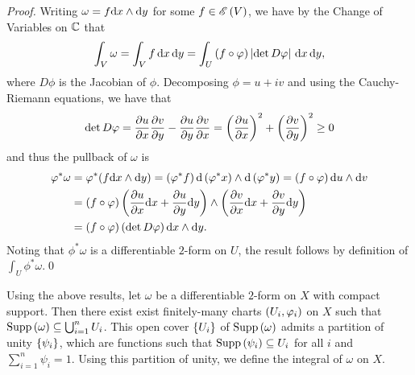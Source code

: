 \documentclass[../Moduli_Spaces_of_Riemann_Surfaces.tex]{subfiles}
\begin{document}
    \begin{proof}
        Writing $\omega=f\mathrm{d} x\wedge\mathrm{d} y$ for some $f\in\mathscr{E}\left(V\right)$, we have by the Change of Variables on $\mathbb{C}$ that
        \begin{equation*}
            \int_V\omega=\int_Vf\,\mathrm{d} x\,\mathrm{d} y=\int_U\left(f\circ\varphi\right)\left|\det D\varphi\right|\,\mathrm{d} x\,\mathrm{d} y,
        \end{equation*}
        where $D\phi$ is the Jacobian of $\phi$. Decomposing $\phi=u+iv$ and using the Cauchy-Riemann equations, we have that
        \begin{equation*}
            \det D\varphi=\frac{\partial u}{\partial x}\frac{\partial v}{\partial y}-\frac{\partial u}{\partial y}\frac{\partial v}{\partial x}=\left(\frac{\partial u}{\partial x}\right)^2+\left(\frac{\partial v}{\partial y}\right)^2\geq0
        \end{equation*}
        and thus the pullback of $\omega$ is
        \begin{equation*}
            \begin{aligned}
                \varphi^\ast\omega&=\varphi^\ast\!\left(f\mathrm{d} x\wedge\mathrm{d} y\right)=\left(\varphi^\ast f\right)\mathrm{d}\left(\varphi^\ast x\right)\wedge\mathrm{d}\left(\varphi^\ast y\right)=\left(f\circ\varphi\right)\mathrm{d} u\wedge \mathrm{d} v \\
                               &=\left(f\circ\varphi\right)\left(\frac{\partial u}{\partial x}\mathrm{d} x+\frac{\partial u}{\partial y}\mathrm{d} y\right)\wedge\left(\frac{\partial v}{\partial x}\mathrm{d} x+\frac{\partial v}{\partial y}\mathrm{d} y\right) \\
                               &=\left(f\circ\varphi\right)\left(\det D\varphi\right)\mathrm{d} x\wedge\mathrm{d} y.
            \end{aligned}
        \end{equation*}
        Noting that $\phi^\ast\omega$ is a differentiable $2$-form on $U$, the result follows by definition of $\int_U\phi^\ast\omega$.\qed
    \end{proof}
    Using the above results, let $\omega$ be a differentiable $2$-form on $X$ with compact support. Then there exist exist finitely-many charts $\left(U_i,\varphi_i\right)$ on $X$ such that $\operatorname{Supp}\left(\omega\right)\subseteq\bigcup_{i=1}^{n}U_i$. This open cover $\left\{U_i\right\}$ of $\operatorname{Supp}\left(\omega\right)$ admits a partition of unity $\left\{\psi_i\right\}$, which are functions such that $\operatorname{Supp}\left(\psi_i\right)\subseteq U_i$ for all $i$ and $\sum_{i=1}^n\psi_i=1$. Using this partition of unity, we define the integral of $\omega$ on $X$.
\end{document}
